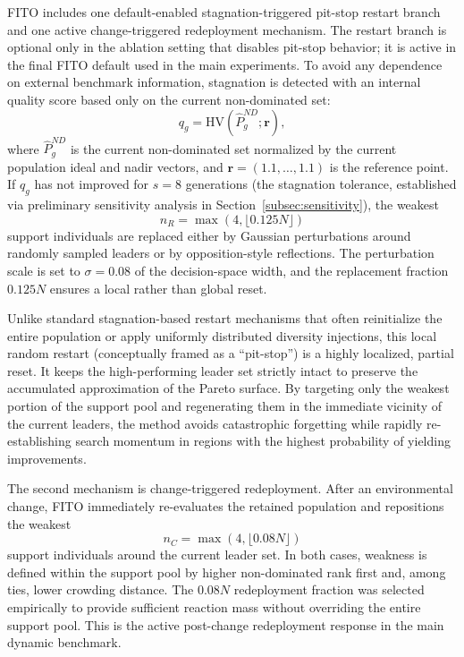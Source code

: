 \documentclass[preprint,12pt]{elsarticle}
\begin{document}
FITO includes one default-enabled stagnation-triggered pit-stop restart branch and one active change-triggered redeployment mechanism. The restart branch is optional only in the ablation setting that disables pit-stop behavior; it is active in the final FITO default used in the main experiments. To avoid any dependence on external benchmark information, stagnation is detected with an internal quality score based only on the current non-dominated set:
\begin{equation}
q_g = \mathrm{HV}\left(\hat{P}^{ND}_g; \mathbf{r}\right),
\end{equation}
where $\hat{P}^{ND}_g$ is the current non-dominated set normalized by the current population ideal and nadir vectors, and $\mathbf{r}=(1.1,\ldots,1.1)$ is the reference point. If $q_g$ has not improved for $s=8$ generations (the stagnation tolerance, established via preliminary sensitivity analysis in Section~\ref{subsec:sensitivity}), the weakest
\begin{equation}
n_R = \max(4,\lfloor 0.125N \rfloor)
\end{equation}
support individuals are replaced either by Gaussian perturbations around randomly sampled leaders or by opposition-style reflections. The perturbation scale is set to $\sigma = 0.08$ of the decision-space width, and the replacement fraction $0.125N$ ensures a local rather than global reset.

Unlike standard stagnation-based restart mechanisms that often reinitialize the entire population or apply uniformly distributed diversity injections, this local random restart (conceptually framed as a ``pit-stop'') is a highly localized, partial reset. It keeps the high-performing leader set strictly intact to preserve the accumulated approximation of the Pareto surface. By targeting only the weakest portion of the support pool and regenerating them in the immediate vicinity of the current leaders, the method avoids catastrophic forgetting while rapidly re-establishing search momentum in regions with the highest probability of yielding improvements.

The second mechanism is change-triggered redeployment. After an environmental change, FITO immediately re-evaluates the retained population and repositions the weakest
\begin{equation}
n_C = \max(4,\lfloor 0.08N \rfloor)
\end{equation}
support individuals around the current leader set. In both cases, weakness is defined within the support pool by higher non-dominated rank first and, among ties, lower crowding distance. The $0.08N$ redeployment fraction was selected empirically to provide sufficient reaction mass without overriding the entire support pool. This is the active post-change redeployment response in the main dynamic benchmark.
\end{document}
